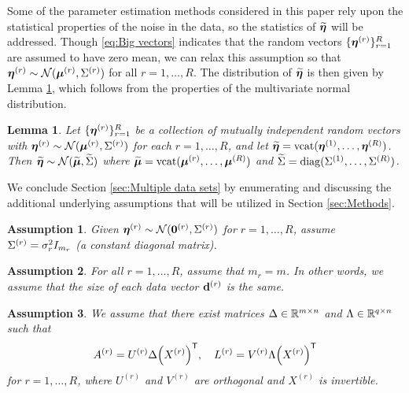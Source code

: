 \documentclass[12pt]{article}
\newtheorem{assumption}{Assumption}
\newtheorem{lemma}{Lemma}[section]
\begin{document}
Some of the parameter estimation methods considered in this paper rely upon the statistical properties of the noise in the data, so the statistics of $\widetilde{\bm{\eta}}$ will be addressed. Though \eqref{eq:Big vectors} indicates that the random vectors $\{\bm{\eta}^{(r)}\}_{r=1}^R$ are assumed to have zero mean, we can relax this assumption so that $\bm{\eta}^{(r)} \sim \mathcal{N}(\bm{\mu}^{(r)},\Sigma^{(r)})$ for all $r = 1,\ldots,R$. The distribution of $\widetilde{\bm{\eta}}$ is then given by Lemma \ref{lem:Concatenation of Normal Noise}, which follows from the properties of the multivariate normal distribution. 
\begin{lemma}
\label{lem:Concatenation of Normal Noise}
Let $\{\bm{\eta}^{(r)}\}_{r=1}^R$ be a collection of mutually independent random vectors with $\bm{\eta}^{(r)} \sim \mathcal{N}(\bm{\mu}^{(r)},\Sigma^{(r)})$ for each $r = 1,\ldots,R$, and let $\widetilde{\bm{\eta}} = \operatorname{vcat}(\bm{\eta}^{(1)},\ldots,\bm{\eta}^{(R)})$. Then $\widetilde{\bm{\eta}} \sim \mathcal{N}(\widetilde{\bm{\mu}},\widetilde{\Sigma})$ where $\widetilde{\bm{\mu}} = \operatorname{vcat}(\bm{\mu}^{(r)},\ldots,\bm{\mu}^{(R)})$ and $\widetilde{\Sigma} = \operatorname{diag}(\Sigma^{(1)},\ldots,\Sigma^{(R)})$.
\end{lemma}

We conclude Section \ref{sec:Multiple data sets} by enumerating and discussing the additional underlying assumptions that will be utilized in Section \ref{sec:Methods}.

\begin{assumption}
\label{Assumption_Noise}
Given $\bm{\eta}^{(r)} \sim \mathcal{N}(\bm{0}^{(r)},\Sigma^{(r)})$ for $r = 1,\ldots,R$, assume $\Sigma^{(r)} = \sigma_r^2 I_{m_r}$ (a constant diagonal matrix).
\end{assumption}

\begin{assumption}
\label{Assumption_Rows}
For all $r = 1,\ldots,R$, assume that $m_r = m$. In other words, we assume that the size of each data vector $\mathbf{d}^{(r)}$ is the same.
\end{assumption} 

\begin{assumption}
\label{Assumption_Decomposition}
We assume that there exist matrices $\Delta \in \mathbb{R}^{m \times n}$ and $\Lambda \in \mathbb{R}^{q \times n}$ such that
\[A^{(r)} = U^{(r)}\Delta{\left(X^{(r)}\right)}^\mathsf{T}, \quad L^{(r)} = V^{(r)}\Lambda{\left(X^{(r)}\right)}^\mathsf{T}\]
for $r = 1,\ldots,R$, where $U^{(r)}$ and $V^{(r)}$ are orthogonal and $X^{(r)}$ is invertible.
\end{assumption}
\end{document}
